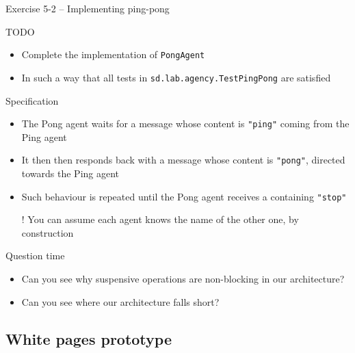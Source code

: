 \documentclass[presentation]{beamer}\mode<presentation>{\usetheme{AMSCesenaPurpleAndGold}}
\begin{document}
\begin{frame}[allowframebreaks]{Exercise 5-2 -- Implementing ping-pong}

\begin{block}{TODO}
    \begin{itemize}
        \item Complete the implementation of \texttt{\alert{PongAgent}}
        
        \item In such a way that all tests in \texttt{sd.lab.agency.\alert{TestPingPong}} are satisfied
    \end{itemize}
\end{block}

\begin{exampleblock}{Specification}
    \begin{itemize}
        \item The Pong agent waits for a message whose content is \texttt{"ping"} coming from the Ping agent
        
        \item It then then responds back with a message whose content is \texttt{"pong"}, directed towards the Ping agent
        
        \item Such behaviour is repeated until the Pong agent receives a containing \texttt{"stop"}
        
        \item[!] You can assume each agent knows the name of the other one, by construction
    \end{itemize}
\end{exampleblock}

\begin{alertblock}{Question time}
    \begin{itemize}
        \item Can you see why suspensive operations are non-blocking in our architecture?
        
        \item Can you see where our architecture falls short?
    \end{itemize}
\end{alertblock}

\end{frame}

\subsection{White pages prototype}
\end{document}

